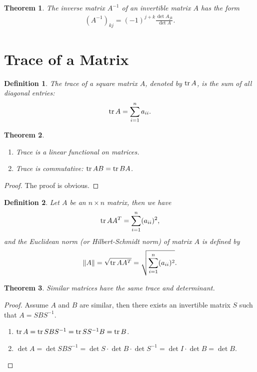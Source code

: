 \documentclass[11pt]{book}
\newtheorem{definition}{Definition}[chapter]
\newtheorem{theorem}{Theorem}[chapter]
\theoremstyle{definition}
\numberwithin{equation}{chapter}
\begin{document}
\begin{theorem}
The inverse matrix $A^{-1}$ of an invertible matrix $A$ has the form
\begin{align*}
    \left(A^{-1}\right)_{kj} = (-1)^{j+k} \frac{\det A_{jk}}{\det A}.
\end{align*}
\end{theorem}

\medskip

\section{Trace of a Matrix}
\begin{definition}\label{definition_trace}
The trace of a square matrix $A$, denoted by $\tr A$, is the sum of all diagonal entries:
\begin{align*}
    \tr A = \sum^n_{i=1} a_{ii}.
\end{align*}
\end{definition}

\medskip

\begin{theorem}
~\begin{enumerate}[label=(\alph*)]
    \item Trace is a linear functional on matrices.
    \item Trace is commutative: $\tr AB = \tr BA$.
\end{enumerate}
\end{theorem}
\begin{proof}
The proof is obvious.
\end{proof}

\medskip

\begin{definition}
Let $A$ be an $n\times n$ matrix, then we have 
\begin{align*}
    \tr AA^T = \sum^n_{i=1}(a_{ii})^2,
\end{align*}
and the Euclidean norm (or Hilbert-Schmidt norm) of matrix $A$ is defined by \begin{align*}
    \|A\| = \sqrt{\tr AA^T} = \sqrt{\sum^n_{i=1}(a_{ii})^2}.
\end{align*}
\end{definition}

\medskip

\begin{theorem}\label{trace_property}
Similar matrices have the same trace and determinant.
\end{theorem}
\begin{proof}
Assume $A$ and $B$ are similar, then there exists an invertible matrix $S$ such that $A = SBS^{-1}$.
\begin{enumerate}[label=(\alph*)]
    \item $\tr A = \tr SBS^{-1} =\tr SS^{-1}B = \tr B$.
    \item $\det A = \det SBS^{-1} = \det S\cdot \det B \cdot \det S^{-1} = \det I\cdot \det B = \det B$.
\end{enumerate}
\end{proof}
\end{document}
